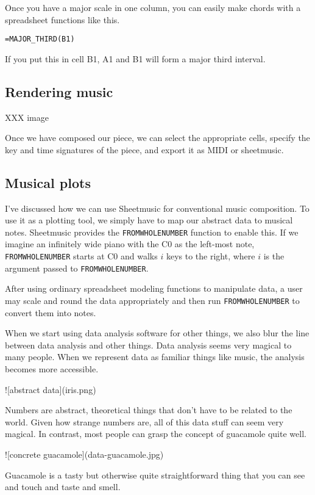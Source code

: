 \documentclass{acm_proc_article-sp}
\begin{document}
Once you have a major scale in one column, you can easily make
chords with a spreadsheet functions like this.
\begin{verbatim}
=MAJOR_THIRD(B1)
\end{verbatim}
If you put this in cell B1, A1 and B1 will form a major third interval.

\subsection{Rendering music}
XXX image

Once we have composed our piece, we can select the appropriate cells,
specify the key and time signatures of the piece, and export it as
MIDI or sheetmusic.

\subsection{Musical plots}
I've discussed how we can use Sheetmusic for conventional music
composition. To use it as a plotting tool, we simply have to map
our abstract data to musical notes. Sheetmusic provides the
\texttt{FROMWHOLENUMBER} function to enable this. If we imagine an
infinitely wide piano with the C0 as the left-most note,
\texttt{FROMWHOLENUMBER} starts at C0 and walks $i$ keys to the right,
where $i$ is the argument passed to \texttt{FROMWHOLENUMBER}.

After using ordinary spreadsheet modeling functions to manipulate data,
a user may scale and round the data appropriately and then run
\texttt{FROMWHOLENUMBER} to convert them into notes.









When we start using data analysis software for other things,
we also blur the line between data analysis and other things.
Data analysis seems very magical to many people. When we represent
data as familiar things like music, the analysis becomes more
accessible.

![abstract data](iris.png)

Numbers are abstract, theoretical things that don't have to be
related to the world. Given how strange numbers are, all of this
data stuff can seem very magical. In contrast, most people can
grasp the concept of guacamole quite well.

![concrete guacamole](data-guacamole.jpg)

Guacamole is a tasty but otherwise quite straightforward thing
that you can see and touch and taste and smell.
\end{document}
